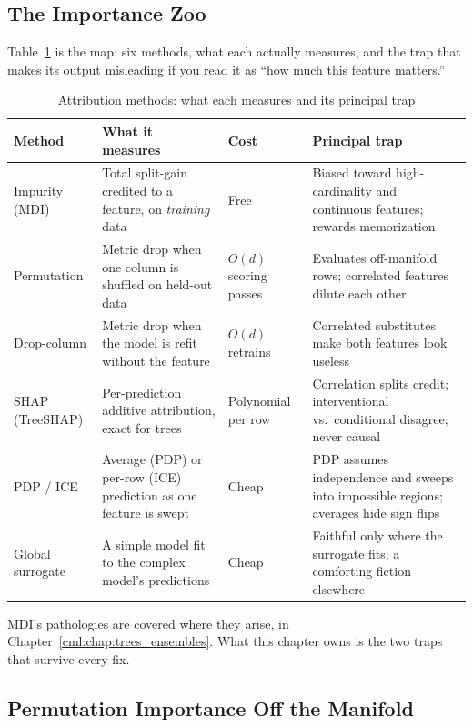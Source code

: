 \subsection{The Importance Zoo}

Table~\ref{cml:tab:importance_zoo} is the map: six methods, what each actually measures, and the trap that makes its output misleading if you read it as ``how much this feature matters.''

\begin{table}[H]
\centering
\small
\caption{Attribution methods: what each measures and its principal trap}
\label{cml:tab:importance_zoo}
\begin{tabularx}{\textwidth}{lXXX}
\toprule
\textbf{Method} & \textbf{What it measures} & \textbf{Cost} & \textbf{Principal trap} \\
\midrule
Impurity (MDI) & Total split-gain credited to a feature, on \emph{training} data & Free & Biased toward high-cardinality and continuous features; rewards memorization \\
Permutation & Metric drop when one column is shuffled on held-out data & $O(d)$ scoring passes & Evaluates off-manifold rows; correlated features dilute each other \\
Drop-column & Metric drop when the model is refit without the feature & $O(d)$ retrains & Correlated substitutes make both features look useless \\
SHAP (TreeSHAP) & Per-prediction additive attribution, exact for trees & Polynomial per row & Correlation splits credit; interventional vs.\ conditional disagree; never causal \\
PDP / ICE & Average (PDP) or per-row (ICE) prediction as one feature is swept & Cheap & PDP assumes independence and sweeps into impossible regions; averages hide sign flips \\
Global surrogate & A simple model fit to the complex model's predictions & Cheap & Faithful only where the surrogate fits; a comforting fiction elsewhere \\
\bottomrule
\end{tabularx}
\end{table}

MDI's pathologies are covered where they arise, in Chapter~\ref{cml:chap:trees_ensembles}. What this chapter owns is the two traps that survive every fix.

\subsection{Permutation Importance Off the Manifold}

